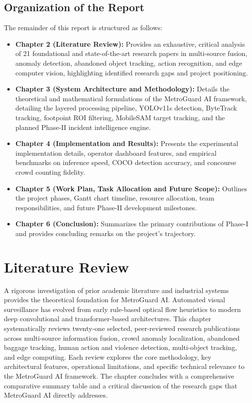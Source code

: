 \documentclass[12pt,a4paper]{report}
\begin{document}
\section{Organization of the Report}
The remainder of this report is structured as follows:
\begin{itemize}
    \item \textbf{Chapter 2 (Literature Review):} Provides an exhaustive, critical analysis of 21 foundational and state-of-the-art research papers in multi-source fusion, anomaly detection, abandoned object tracking, action recognition, and edge computer vision, highlighting identified research gaps and project positioning.
    \item \textbf{Chapter 3 (System Architecture and Methodology):} Details the theoretical and mathematical formulations of the MetroGuard AI framework, detailing the layered processing pipeline, YOLOv11s detection, ByteTrack tracking, footpoint ROI filtering, MobileSAM target tracking, and the planned Phase-II incident intelligence engine.
    \item \textbf{Chapter 4 (Implementation and Results):} Presents the experimental implementation details, operator dashboard features, and empirical benchmarks on inference speed, COCO detection accuracy, and concourse crowd counting fidelity.
    \item \textbf{Chapter 5 (Work Plan, Task Allocation and Future Scope):} Outlines the project phases, Gantt chart timeline, resource allocation, team responsibilities, and future Phase-II development milestones.
    \item \textbf{Chapter 6 (Conclusion):} Summarizes the primary contributions of Phase-I and provides concluding remarks on the project's trajectory.
\end{itemize}


\chapter{Literature Review}
\noindent A rigorous investigation of prior academic literature and industrial systems provides the theoretical foundation for MetroGuard AI. Automated visual surveillance has evolved from early rule-based optical flow heuristics to modern deep convolutional and transformer-based architectures. This chapter systematically reviews twenty-one selected, peer-reviewed research publications across multi-source information fusion, crowd anomaly localization, abandoned baggage tracking, human action and violence detection, multi-object tracking, and edge computing. Each review explores the core methodology, key architectural features, operational limitations, and specific technical relevance to the MetroGuard AI framework. The chapter concludes with a comprehensive comparative summary table and a critical discussion of the research gaps that MetroGuard AI directly addresses.
\end{document}
